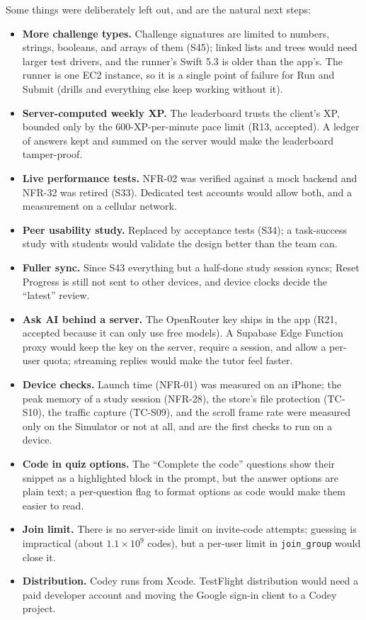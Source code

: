 \documentclass[12pt,letterpaper]{article}
\begin{document}
Some things were deliberately left out, and are the natural next steps:
\begin{itemize}
  \item \textbf{More challenge types.} Challenge signatures are limited to numbers,
        strings, booleans, and arrays of them (S45); linked lists and trees would need
        larger test drivers, and the runner's Swift 5.3 is older than the app's. The
        runner is one EC2 instance, so it is a single point of failure for Run and
        Submit (drills and everything else keep working without it).
  \item \textbf{Server-computed weekly XP.} The leaderboard trusts the client's XP,
        bounded only by the 600-XP-per-minute pace limit (R13, accepted). A ledger of
        answers kept and summed on the server would make the leaderboard
        tamper-proof.
  \item \textbf{Live performance tests.} NFR-02 was verified against a mock backend
        and NFR-32 was retired (S33). Dedicated test accounts would allow both, and
        a measurement on a cellular network.
  \item \textbf{Peer usability study.} Replaced by acceptance tests (S34);
        a task-success study with students would validate the design better than the
        team can.
  \item \textbf{Fuller sync.} Since S43 everything but a half-done study session
        syncs; Reset Progress is still not sent to other devices, and device clocks
        decide the ``latest'' review.
  \item \textbf{Ask AI behind a server.} The OpenRouter key ships in the app (R21,
        accepted because it can only use free models). A Supabase Edge Function proxy
        would keep the key on the server, require a session, and allow a per-user
        quota; streaming replies would make the tutor feel faster.
  \item \textbf{Device checks.} Launch time (NFR-01) was measured on an iPhone; the
        peak memory of a study session (NFR-28), the store's file protection
        (TC-S10), the traffic capture (TC-S09), and the scroll frame rate were
        measured only on the Simulator or not at all, and are the first checks to
        run on a device.
  \item \textbf{Code in quiz options.} The ``Complete the code'' questions show their
        snippet as a highlighted block in the prompt, but the answer options are plain
        text; a per-question flag to format options as code would make them easier to
        read.
  \item \textbf{Join limit.} There is no server-side limit on invite-code attempts;
        guessing is impractical (about $1.1 \times 10^9$ codes), but a per-user limit
        in \texttt{join\_group} would close it.
  \item \textbf{Distribution.} Codey runs from Xcode. TestFlight distribution would
        need a paid developer account and moving the Google sign-in client to a Codey
        project.
\end{itemize}
\end{document}
